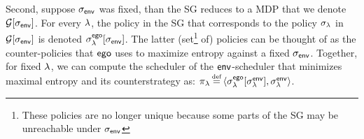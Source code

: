 Second, suppose ${\sigma_{\mathsf{env}}}$ was fixed, than the SG reduces to 
a MDP that we denote $\mathcal{G}[{\sigma_{\mathsf{env}}}]$.
For every $\lambda$, the policy in the SG that corresponds to the policy $\sigma_\lambda$ in $\mathcal{G}[{\sigma_{\mathsf{env}}}]$ is denoted $\sigma^{\mathsf{ego}}_\lambda[{\sigma_{\mathsf{env}}}]$.
The latter (set\footnote{These policies are no longer unique because some parts of the SG may be unreachable under ${\sigma_{\mathsf{env}}}$} of) policies can be thought of as the counter-policies that $\mathsf{ego}$ uses to maximize entropy against a fixed ${\sigma_{\mathsf{env}}}$. 
Together, for fixed $\lambda$, we can compute the scheduler of the $\mathsf{env}$-scheduler that minimizes maximal entropy and its counterstrategy as: $\pi_\rat \eqdef \langle
\sched^\pOne_\rat[\sched_\rat^\pTwo] , \sched_\rat^\pTwo \rangle$.
%


